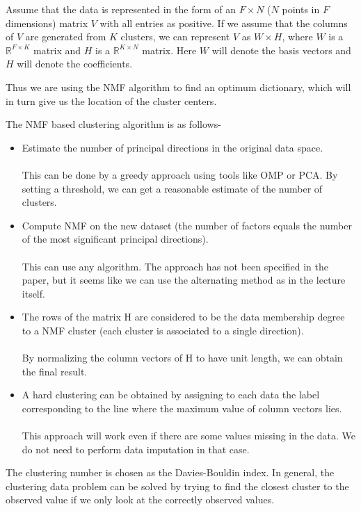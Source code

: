 \documentclass[a4paper,14pt]{article}
\numberwithin{definition}{section}
\numberwithin{mytheorem}{subsection}
\begin{document}
Assume that the data is represented in the form of an $F\times N$ ($N$ points in $F$ dimensions) matrix $V$ with all entries as positive. If we assume that the columns of $V$ are generated from $K$ clusters, we can represent $V$ as $W\times H$, where $W$ is a $\mathbb{R}^{F \times K}$ matrix and $H$ is a $\mathbb{R}^{K \times N}$ matrix. Here $W$ will denote the basis vectors and $H$ will denote the coefficients.

Thus we are using the NMF algorithm to find an optimum dictionary, which will in turn give us the location of the cluster centers.

The NMF based clustering algorithm is as follows-
\begin{itemize}
    \item  Estimate the number of principal directions in the original data space.\\\\
    This can be done by a greedy approach using tools like OMP or PCA. By setting a threshold, we can get a reasonable estimate of the number of clusters.
    \item Compute NMF on the new dataset (the number of factors equals the number of the most significant principal directions).\\\\
    This can use any algorithm. The approach has not been specified in the paper, but it seems like we can use the alternating method as in the lecture itself.
    \item The rows of the matrix H are considered to be the data membership degree to a NMF cluster (each cluster is associated to a single direction).\\\\
    By normalizing the column vectors of H to have unit length, we can obtain the final result.
    \item A hard clustering can be obtained by assigning to each data the label corresponding to the line where the maximum value of column vectors lies.\\\\
    This approach will work even if there are some values missing in the data. We do not need to perform data imputation in that case.

    
\end{itemize}

The clustering number is chosen as the Davies-Bouldin index. In general, the clustering data problem can be solved by trying to find the closest cluster to the observed value if we only look at the correctly observed values.
\end{document}

